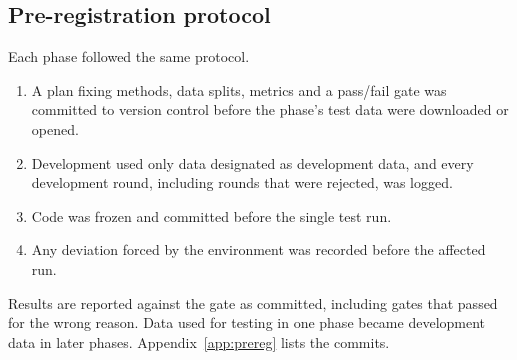 \documentclass[acmlarge,screen,review]{acmart}
\begin{document}
\subsection{Pre-registration protocol}
Each phase followed the same protocol.
\begin{enumerate}
\item A plan fixing methods, data splits, metrics and a pass/fail gate was committed to version control before the
phase's test data were downloaded or opened.
\item Development used only data designated as development data, and every development round, including rounds
that were rejected, was logged.
\item Code was frozen and committed before the single test run.
\item Any deviation forced by the environment was recorded before the affected run.
\end{enumerate}
Results are reported against the gate as committed, including gates that passed for the wrong reason. Data used
for testing in one phase became development data in later phases. Appendix~\ref{app:prereg} lists the commits.
\end{document}

